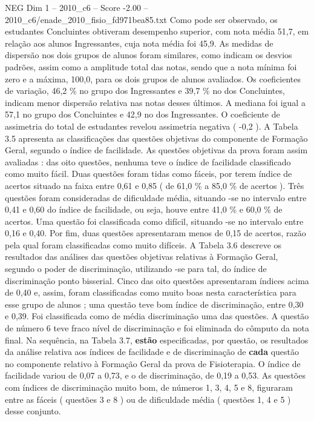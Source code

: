 \begin{textsample}{NEG Dim 1 – 2010\_c6 – Score -2.00 – 2010\_c6/enade\_2010\_fisio\_fd971bea85.txt}
Como pode ser observado, os estudantes Concluintes obtiveram desempenho superior, com nota média 51,7, em relação aos alunos Ingressantes, cuja nota média foi 45,9.
As medidas de dispersão nos dois grupos de alunos foram similares, como indicam os desvios padrões, assim como a amplitude total das notas, sendo que a nota mínima foi zero e a máxima, 100,0, para os dois grupos de alunos avaliados.
Os coeficientes de variação, 46,2 \% no grupo dos Ingressantes e 39,7 \% no dos Concluintes, indicam menor dispersão relativa nas notas desses últimos.
A mediana foi igual a 57,1 no grupo dos Concluintes e 42,9 no dos Ingressantes.
O coeficiente de assimetria do total de estudantes revelou assimetria negativa ( -0,2 ).
A Tabela 3.5 apresenta as classificações das questões objetivas do componente de Formação Geral, segundo o índice de facilidade.
As questões objetivas da prova foram assim avaliadas : das oito questões, nenhuma teve o índice de facilidade classificado como muito fácil.
Duas questões foram tidas como fáceis, por terem índice de acertos situado na faixa entre 0,61 e 0,85 ( de 61,0 \% a 85,0 \% de acertos ).
Três questões foram consideradas de dificuldade média, situando -se no intervalo entre 0,41 e 0,60 do índice de facilidade, ou seja, houve entre 41,0 \% e 60,0 \% de acertos.
Uma questão foi classificada como difícil, situando -se no intervalo entre 0,16 e 0,40.
Por fim, duas questões apresentaram menos de 0,15 de acertos, razão pela qual foram classificadas como muito difíceis.
A Tabela 3.6 descreve os resultados das análises das questões objetivas relativas à Formação Geral, segundo o poder de discriminação, utilizando -se para tal, do índice de discriminação ponto bisserial.
Cinco das oito questões apresentaram índices acima de 0,40 e, assim, foram classificadas como muito boas nesta característica para esse grupo de alunos ; uma questão teve bom índice de discriminação, entre 0,30 e 0,39.
Foi classificada como de média discriminação uma das questões.
A questão de número 6 teve fraco nível de discriminação e foi eliminada do cômputo da nota final.
Na sequência, na Tabela 3.7, \textbf{estão} especificadas, por questão, os resultados da análise relativa aos índices de facilidade e de discriminação de \textbf{cada} questão no componente relativo à Formação Geral da prova de Fisioterapia.
O índice de facilidade variou de 0,07 a 0,73, e o de discriminação, de 0,19 a 0,53.
As questões com índices de discriminação muito bom, de números 1, 3, 4, 5 e 8, figuraram entre as fáceis ( questões 3 e 8 ) ou de dificuldade média ( questões 1, 4 e 5 ) desse conjunto.

\end{textsample}
